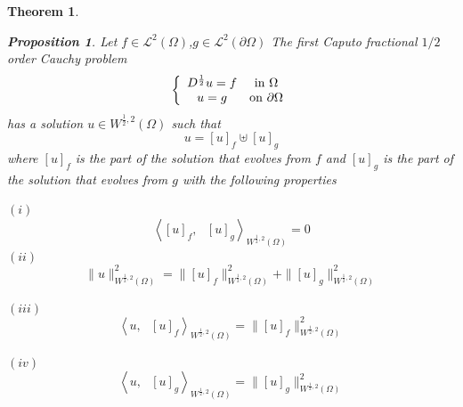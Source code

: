 \documentclass[10pt,a4paper]{amsart}
\newtheorem{theorem}{Theorem}
\newtheorem{proposition}{Proposition}
\numberwithin{equation}{section}
\begin{document}
\begin{theorem}
\begin{proposition}
Let $f\in%
\mathcal{L}%
^{2}\left(  \Omega\right)  $,$g\in%
\mathcal{L}%
^{2}\left(  \partial\Omega\right)  $ The first Caputo fractional $1/2$ order
Cauchy problem%
\begin{equation}
\left\{
\begin{array}
[c]{cc}%
D^{\frac{1}{2}}u=f & \text{in }\Omega\\
u=g & \text{on }\partial\Omega
\end{array}
\right.
\end{equation}
has a solution $u\in W^{\frac{1}{2},2}\left(  \Omega\right)  $ such that
\[
u=\left[  u\right]  _{f}\uplus\left[  u\right]  _{g}%
\]
where $\left[  u\right]  _{f}$ is the part of the solution that evolves from
$f $ and $\left[  u\right]  _{g}$ is the part of the solution that evolves
from $g $ with the following properties

$(i)$
\[
\left\langle \left[  u\right]  _{f},\text{ }\left[  u\right]  _{g}%
\right\rangle _{W^{\frac{1}{2},2}\left(  \Omega\right)  }=0
\]
$\left(  ii\right)  $%
\[
\parallel u\parallel_{W^{\frac{1}{2},2}\left(  \Omega\right)  }^{2}%
=\parallel\left[  u\right]  _{f}\parallel_{W^{\frac{1}{2},2}\left(
\Omega\right)  }^{2}+\parallel\left[  u\right]  _{g}\parallel_{W^{\frac{1}%
{2},2}\left(  \Omega\right)  }^{2}%
\]

\end{proposition}

$\left(  iii\right)  $
\[
\left\langle u,\text{ }\left[  u\right]  _{f}\right\rangle _{W^{\frac{1}{2}%
,2}\left(  \Omega\right)  }=\parallel\left[  u\right]  _{f}\parallel
_{W^{\frac{1}{2},2}\left(  \Omega\right)  }^{2}%
\]


$\left(  iv\right)  $
\[
\left\langle u,\text{ }\left[  u\right]  _{g}\right\rangle _{W^{\frac{1}{2}%
,2}\left(  \Omega\right)  }=\parallel\left[  u\right]  _{g}\parallel
_{W^{\frac{1}{2},2}\left(  \Omega\right)  }^{2}%
\]

\end{theorem}
\end{document}
